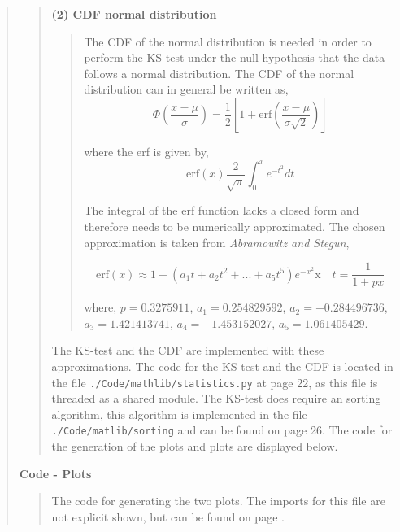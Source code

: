 \begin{quote}
\begin{quote}
\textbf{(2) CDF normal distribution}
\begin{quote}
The CDF of the normal distribution is needed in order to perform the KS-test under the null hypothesis that the data follows a normal distribution. The CDF of the normal distribution can in general be written as,
\begin{equation}
\Phi\left( \frac{x- \mu}{\sigma}\right) = \frac{1}{2} \left[ 1 + \text{erf} \left( \frac{x - \mu}{\sigma\sqrt{2}} \right) \right]
\end{equation}

where the erf is given by,
\begin{equation}
\text{erf}(x)  \frac{2}{\sqrt{\pi}} \int_0^{x} e^{-t^2} dt
\end{equation}

The integral of the erf function lacks a closed form and therefore needs to be numerically approximated. The chosen approximation is taken from \textit{Abramowitz and Stegun},

\begin{equation}
\text{erf}(x) \approx 1- (a_1t+a_2t^2 + ... + a_5t^5)e^{-x^2} \text{x} \quad t = \frac{1}{1+px}
\end{equation}

where, $p  =0.3275911$, $a_1 =  0.254829592$, $a_2 = -0.284496736$, $a_3 = 1.421413741$, $a_4 =  -1.453152027$, $a_5 = 1.061405429$.
\end{quote}

The KS-test and the CDF are implemented with these approximations. The code for the KS-test and the CDF  is located in the file \texttt{./Code/mathlib/statistics.py} at page 22, as this file is threaded as a shared module. The KS-test does require an sorting algorithm, this algorithm is implemented in the file \texttt{./Code/matlib/sorting} and can be found on page 26. 
 The code for the generation of the plots and plots are displayed below.  
\end{quote}

\newpage
\textbf{Code - Plots}

\begin{quote}
The code for generating the two plots. The imports for this file are not explicit shown, but can be found on page \pageref{CODE:MAIN1}.

\end{quote}
\newpage


\end{quote}
